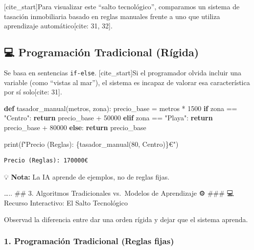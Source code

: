 \documentclass[
  spanish,
  letterpaper,
  DIV=11,
  numbers=noendperiod,
  oneside]{scrreprt}
\newenvironment{Shaded}{\begin{snugshade}}{\end{snugshade}}
\newcommand{\BuiltInTok}[1]{\textcolor[rgb]{0.00,0.23,0.31}{#1}}
\newcommand{\ControlFlowTok}[1]{\textcolor[rgb]{0.00,0.23,0.31}{\textbf{#1}}}
\newcommand{\DecValTok}[1]{\textcolor[rgb]{0.68,0.00,0.00}{#1}}
\newcommand{\KeywordTok}[1]{\textcolor[rgb]{0.00,0.23,0.31}{\textbf{#1}}}
\newcommand{\NormalTok}[1]{\textcolor[rgb]{0.00,0.23,0.31}{#1}}
\newcommand{\OperatorTok}[1]{\textcolor[rgb]{0.37,0.37,0.37}{#1}}
\newcommand{\SpecialCharTok}[1]{\textcolor[rgb]{0.37,0.37,0.37}{#1}}
\newcommand{\SpecialStringTok}[1]{\textcolor[rgb]{0.13,0.47,0.30}{#1}}
\newcommand{\StringTok}[1]{\textcolor[rgb]{0.13,0.47,0.30}{#1}}
\begin{document}
{[}cite\_start{]}Para visualizar este ``salto tecnológico'', comparamos
un sistema de tasación inmobiliaria basado en reglas manuales frente a
uno que utiliza aprendizaje automático{[}cite: 31, 32{]}.

\subsection{💻 Programación Tradicional (Rígida)}

Se basa en sentencias \texttt{if-else}. {[}cite\_start{]}Si el
programador olvida incluir una variable (como ``vistas al mar''), el
sistema es incapaz de valorar esa característica por sí solo{[}cite:
31{]}.

\begin{Shaded}
\begin{Highlighting}[]
\KeywordTok{def}\NormalTok{ tasador\_manual(metros, zona):}
\NormalTok{    precio\_base }\OperatorTok{=}\NormalTok{ metros }\OperatorTok{*} \DecValTok{1500}
    \ControlFlowTok{if}\NormalTok{ zona }\OperatorTok{==} \StringTok{"Centro"}\NormalTok{:}
        \ControlFlowTok{return}\NormalTok{ precio\_base }\OperatorTok{+} \DecValTok{50000}
    \ControlFlowTok{elif}\NormalTok{ zona }\OperatorTok{==} \StringTok{"Playa"}\NormalTok{:}
        \ControlFlowTok{return}\NormalTok{ precio\_base }\OperatorTok{+} \DecValTok{80000}
    \ControlFlowTok{else}\NormalTok{:}
        \ControlFlowTok{return}\NormalTok{ precio\_base}

\BuiltInTok{print}\NormalTok{(}\SpecialStringTok{f"Precio (Reglas): }\SpecialCharTok{\{}\NormalTok{tasador\_manual(}\DecValTok{80}\NormalTok{, }\StringTok{\textquotesingle{}Centro\textquotesingle{}}\NormalTok{)}\SpecialCharTok{\}}\SpecialStringTok{€"}\NormalTok{)}
\end{Highlighting}
\end{Shaded}

\begin{verbatim}
Precio (Reglas): 170000€
\end{verbatim}

💡 \textbf{Nota:} La IA aprende de ejemplos, no de reglas fijas.

\ldots.. \#\# 3. Algoritmos Tradicionales vs.~Modelos de Aprendizaje ⚙️
\#\#\# 💻 Recurso Interactivo: El Salto Tecnológico

Observad la diferencia entre dar una orden rígida y dejar que el sistema
aprenda.

\subsubsection{1. Programación Tradicional (Reglas
fijas)}\label{programaciuxf3n-tradicional-reglas-fijas}
\end{document}
